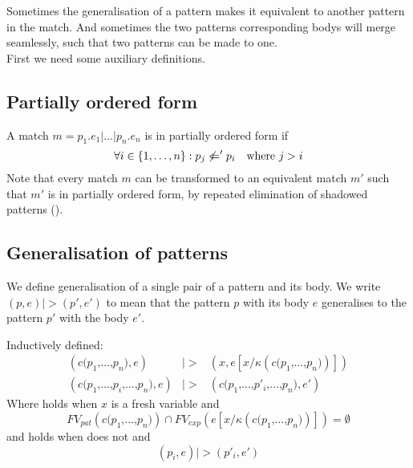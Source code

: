 Sometimes the generalisation of a pattern makes it equivalent to another pattern
in the match. And sometimes the two patterns corresponding bodys will merge
seamlessly, such that two patterns can be made to one.
\\[1em]
First we need some auxiliary definitions.

\subsection{Partially ordered form}
\begin{definition}\label{def:part-order-form}
  A match $m = p_1\texttt{.}e_1\texttt{|}\ldots\texttt{|}p_n\texttt{.}e_n$ is in
  partially ordered form if
  \[
  \forall i \in \{1, \ldots, n\} : p_j \not <=' p_i \quad \textnormal{where $j > i$}
  \]
  Note that every match $m$ can be transformed to an equivalent match $m'$ such
  that $m'$ is in partially ordered form, by repeated elimination of shadowed
  patterns ().
\end{definition}

\subsection{Generalisation of patterns}
We define generalisation of a single pair of a pattern and its body. We write
$(p, e) |> (p', e')$ to mean that the pattern $p$ with its body $e$ generalises
to the pattern $p'$ with the body $e'$.

\begin{definition}
\label{def:gener-patt}
Inductively defined:
\begin{eqnarray}
  (c \texttt{(} p_1 \texttt{,} \ldots \texttt{,} p_n \texttt{)} , e) &|>& (x , e[x
  / \kappa (c \texttt{(} p_1 \texttt{,} \ldots \texttt{,} p_n \texttt{)} )]) \label{eq:single-gen-1}\\
  (c \texttt{(} p_1 \texttt{,} \ldots \texttt{,} p_i \texttt{,} \ldots
  \texttt{,} p_n \texttt{)}, e) &|>&
  (c \texttt{(} p_1 \texttt{,} \ldots \texttt{,} p'_i \texttt{,} \ldots
  \texttt{,} p_n \texttt{)}, e') \label{eq:single-gen-2}
\end{eqnarray}
Where  holds when $x$ is a fresh variable and
\[
FV_{pat}(c\texttt{(}p_1\texttt{,}\ldots\texttt{,}p_n\texttt{)}) \cap FV_{exp}(e[x/\kappa
(c\texttt{(}p_1\texttt{,}\ldots\texttt{,}p_n\texttt{)})]) = \emptyset
\]
and  holds when  does not and
\[
(p_i , e) |> (p'_i , e')
\]
\end{definition}


